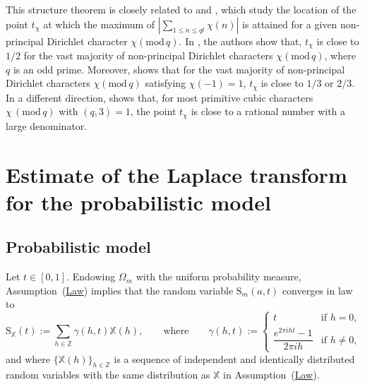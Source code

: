 \documentclass[12pt]{amsart}
\theoremstyle{definition}
\numberwithin{equation}{section}
\numberwithin{equation}{section}
\def\Z{\mathbb{Z}}
\def\mod{\mathrm{mod}}
\def\B{\mathrm{S}}
\def\S{\mathrm{S}}
\def\X{\mathbb{X}}
\begin{document}
This structure theorem is closely related to \cite[Theorem 1.2]{BGGK18} and \cite[Theorem 1.3]{LN24}, which study the location of the point $t_\chi$ at which the maximum of $\left| \sum_{1\leq n\leq q t } \chi(n) \right|$ is attained for a given non-principal
Dirichlet character $\chi (\mod \,  q)$. In \cite[Theorem 1.2]{BGGK18}, the authors show that, \(t_\chi\) is close to $1/2$ for the vast majority of non-principal Dirichlet characters $\chi (\mod \,q)$, where $q$ is an odd prime. Moreover, \cite[Theorem 2.3]{BGGK18} shows that for the vast majority of non-principal Dirichlet characters $\chi (\mod \,q)$ satisfying $\chi(-1) = 1$, $t_\chi $ is close to $ 1/3$ or $2/3$.
In a different direction, \cite[Theorem 1.3]{LN24} shows that, for most primitive cubic characters \(\chi \,(\mathrm{mod}\, q)\) with \((q,3)=1\), the point \(t_\chi\) is close to a rational number with a large denominator.



\section{Estimate of the Laplace transform for the probabilistic model}
\subsection{Probabilistic model}
Let \(t\in[0,1]\). Endowing \(\Omega_m\) with the uniform probability measure, Assumption~(\hyperlink{Ass Law}{Law}) implies that the random variable \(\B_m(a,t)\) converges in law to
\begin{equation}\label{eq def gamma(h,t)}
\S_\X(t) 
:= \sum_{h\in\Z} \gamma(h,t)\X(h),
\qquad\text{where}\qquad
\gamma(h,t):=
\begin{cases}
t & \text{if } h=0,\\[0.2cm]
\dfrac{e^{2\pi i ht}-1}{2\pi i h} & \text{if } h\neq 0,
\end{cases}
\end{equation}
and where \(\{\X(h)\}_{h\in\Z}\) is a sequence of independent and identically distributed random variables with the same distribution as \(\X\) in Assumption~(\hyperlink{Ass Law}{Law}).
\end{document}
